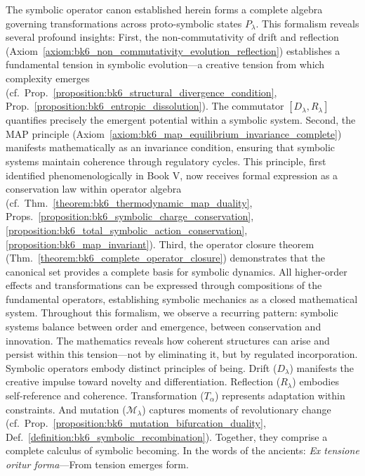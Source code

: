The symbolic operator canon established herein forms a complete algebra governing transformations across proto-symbolic states $P_\lambda$. This formalism reveals several profound insights:
First, the non-commutativity of drift and reflection (Axiom~\ref{axiom:bk6_non_commutativity_evolution_reflection}) establishes a fundamental tension in symbolic evolution—a creative tension from which complexity emerges (cf.~Prop.~\ref{proposition:bk6_structural_divergence_condition}, Prop.~\ref{proposition:bk6_entropic_dissolution}). The commutator $[D_\lambda, R_\lambda]$ quantifies precisely the emergent potential within a symbolic system.
Second, the MAP principle (Axiom~\ref{axiom:bk6_map_equilibrium_invariance_complete}) manifests mathematically as an invariance condition, ensuring that symbolic systems maintain coherence through regulatory cycles. This principle, first identified phenomenologically in Book V, now receives formal expression as a conservation law within operator algebra (cf.~Thm.~\ref{theorem:bk6_thermodynamic_map_duality}, Props.~\ref{proposition:bk6_symbolic_charge_conservation}, \ref{proposition:bk6_total_symbolic_action_conservation}, \ref{proposition:bk6_map_invariant}).
Third, the operator closure theorem (Thm.~\ref{theorem:bk6_complete_operator_closure}) demonstrates that the canonical set provides a complete basis for symbolic dynamics. All higher-order effects and transformations can be expressed through compositions of the fundamental operators, establishing symbolic mechanics as a closed mathematical system.
Throughout this formalism, we observe a recurring pattern: symbolic systems balance between order and emergence, between conservation and innovation. The mathematics reveals how coherent structures can arise and persist within this tension—not by eliminating it, but by regulated incorporation.
Symbolic operators embody distinct principles of being. Drift ($D_\lambda$) manifests the creative impulse toward novelty and differentiation. Reflection ($R_\lambda$) embodies self-reference and coherence. Transformation ($T_\alpha$) represents adaptation within constraints. And mutation ($\mathcal{M}_\lambda$) captures moments of revolutionary change (cf.~Prop.~\ref{proposition:bk6_mutation_bifurcation_duality}, Def.~\ref{definition:bk6_symbolic_recombination}). Together, they comprise a complete calculus of symbolic becoming.
In the words of the ancients: \textit{Ex tensione oritur forma}—From tension emerges form.
